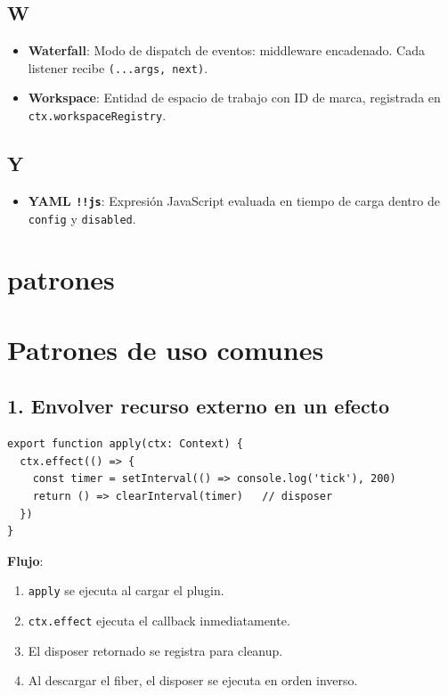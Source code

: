 \documentclass[11pt,a4paper]{article}
\begin{document}
\subsection*{W}


\begin{itemize}[leftmargin=*,topsep=2pt,itemsep=1pt]
  \item \textbf{Waterfall}: Modo de dispatch de eventos: middleware encadenado. Cada listener recibe \texttt{(...args, next)}.
  \item \textbf{Workspace}: Entidad de espacio de trabajo con ID de marca, registrada en \texttt{ctx.workspaceRegistry}.
\end{itemize}


\subsection*{Y}


\begin{itemize}[leftmargin=*,topsep=2pt,itemsep=1pt]
  \item \textbf{YAML \texttt{!!js}}: Expresión JavaScript evaluada en tiempo de carga dentro de \texttt{config} y \texttt{disabled}.
\end{itemize}


\section*{patrones}

\section*{Patrones de uso comunes}


\subsection*{1. Envolver recurso externo en un efecto}


\begin{lstlisting}
export function apply(ctx: Context) {
  ctx.effect(() => {
    const timer = setInterval(() => console.log('tick'), 200)
    return () => clearInterval(timer)   // disposer
  })
}
\end{lstlisting}


\textbf{Flujo}:


\begin{enumerate}[leftmargin=*,topsep=2pt,itemsep=1pt]
  \item \texttt{apply} se ejecuta al cargar el plugin.
  \item \texttt{ctx.effect} ejecuta el callback inmediatamente.
  \item El disposer retornado se registra para cleanup.
  \item Al descargar el fiber, el disposer se ejecuta en orden inverso.
\end{enumerate}
\end{document}

